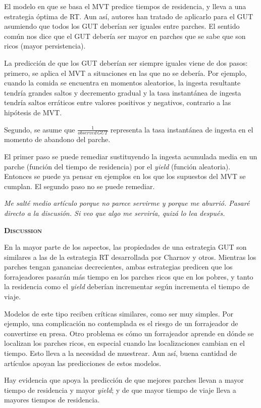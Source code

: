 \documentclass[a4paper,12pt]{article}
\begin{document}
El modelo en que se basa el MVT predice tiempos de residencia, y lleva a una estrategia óptima de RT. Aun así, autores han tratado de aplicarlo para el GUT asumiendo que todos los GUT deberían ser iguales entre parches. El sentido común nos dice que el GUT debería ser mayor en parches que se sabe que son ricos (mayor persistencia).

La predicción de que los GUT deberían ser siempre iguales viene de dos pasos: primero, se aplica el MVT a situaciones en las que no se debería. Por ejemplo, cuando la comida se encuentra en momentos aleatorios, la ingesta resultante tendría grandes saltos y decremento gradual y la tasa instantánea de ingesta tendría saltos erráticos entre valores positivos y negativos, contrario a las hipótesis de MVT.

Segundo, se asume que $\frac{1}{observed\,GUT}$ representa la tasa instantánea de ingesta en el momento de abandono del parche.

El primer paso se puede remediar sustituyendo la ingesta acumulada media en un parche (función del tiempo de residencia) por el {\itshape yield} (función aleatoria). Entonces se puede ya pensar en ejemplos en los que los supuestos del MVT se cumplan. El segundo paso no se puede remediar.

{\itshape Me salté medio artículo porque no parece servirme y porque me aburrió. Pasaré directo a la discusión. Si veo que algo me serviría, quizá lo lea después.}

{\scshape\bfseries Discussion}

En la mayor parte de los aspectos, las propiedades de una estrategia GUT son similares a las de la estrategia RT desarrollada por Charnov y otros. Mientras los parches tengan ganancias decrecientes, ambas estrategias predicen que los forrajeadores pasarán más tiempo en los parches ricos que en los pobres, y tanto la residencia como el {\itshape yield} deberían incrementar según incrementa el tiempo de viaje.

Modelos de este tipo reciben críticas similares, como ser muy simples. Por ejemplo, una complicación no contemplada es el riesgo de un forrajeador de convertirse en presa. Otro problema es cómo un forrajeador aprende en dónde se localizan los parches ricos, en especial cuando las localizaciones cambian en el tiempo. Esto lleva a la necesidad de muestrear. Aun así, buena cantidad de artículos apoyan las predicciones de estos modelos.

Hay evidencia que apoya la predicción de que mejores parches llevan a mayor tiempo de residencia y mayor {\itshape yield}; y de que mayor tiempo de viaje lleva a mayores tiempos de residencia.
\end{document}

